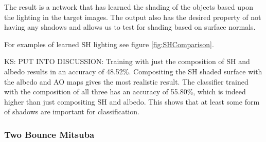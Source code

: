 \documentclass[10pt,twocolumn,letterpaper]{article}
\newcommand{\kris}[1]{{\color{red} KS: #1}}
\begin{document}
The result is a network that has learned the shading of the objects based upon the lighting in the target images.  The output also has the desired property of not having any shadows and allows us to test for shading based on surface normals.

For examples of  learned SH lighting see figure \ref{fig:SHComparison}.

\kris{PUT INTO DISCUSSION: Training with just the composition of SH and albedo results in an accuracy of 48.52\%.   Compositing the SH shaded surface with the albedo and AO maps gives the most realistic result.  The classifier trained with the composition of all three has an accuracy of 55.80\%, which is indeed higher than just compositing SH and albedo.  This shows that at least some form of shadows are important for classification.}


\subsubsection{Two Bounce Mitsuba}\label{sec:2bounce}
\end{document}
